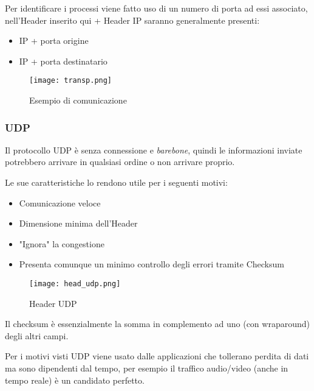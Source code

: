 \documentclass{article}
\begin{document}
\noindent Per identificare i processi viene fatto uso di un numero di porta ad essi associato, nell'Header inserito qui + Header IP saranno generalmente presenti:
\begin{itemize}
    \item IP + porta origine
    \item IP + porta destinatario
\end{itemize}

\begin{figure}[ht]
    \centering
    \texttt{[image: transp.png]}
    \caption{Esempio di comunicazione}
    \label{fig:transo}
\end{figure}

\subsubsection{UDP}

Il protocollo UDP è senza connessione e \textit{barebone}, quindi le informazioni inviate potrebbero arrivare in qualsiasi ordine o non arrivare proprio.\newline

\noindent Le sue caratteristiche lo rendono utile per i seguenti motivi:
\begin{itemize}
    \item Comunicazione veloce
    \item Dimensione minima dell'Header
    \item "Ignora" la congestione
    \item Presenta comunque un minimo controllo degli errori tramite Checksum\newline
\end{itemize}

\begin{figure}[ht]
    \centering
    \texttt{[image: head\_udp.png]}
    \caption{Header UDP}
    \label{fig:head_udp}
\end{figure}

\noindent Il checksum è essenzialmente la somma in complemento ad uno (con wraparound) degli altri campi.\newline

\noindent Per i motivi visti UDP viene usato dalle applicazioni che tollerano perdita di dati ma sono dipendenti dal tempo, per esempio il traffico audio/video (anche in tempo reale) è un candidato perfetto.\newline

\newpage
\end{document}
